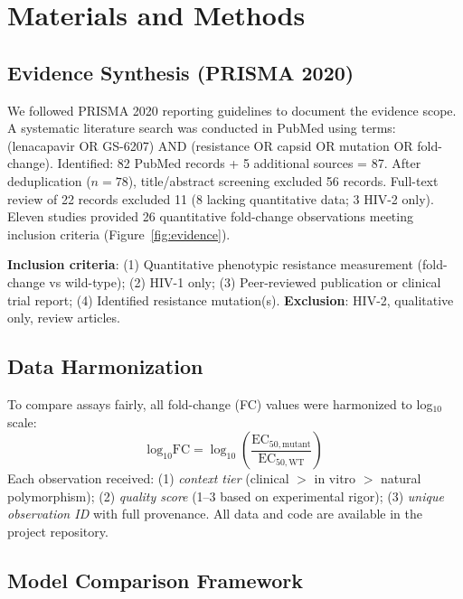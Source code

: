 \documentclass[12pt,a4paper]{article}
\begin{document}
\section{Materials and Methods}

\subsection{Evidence Synthesis (PRISMA 2020)}

We followed PRISMA 2020 reporting guidelines \cite{Page2021} to document the evidence scope. A systematic literature search was conducted in PubMed using terms: (lenacapavir OR GS-6207) AND (resistance OR capsid OR mutation OR fold-change). Identified: 82 PubMed records + 5 additional sources = 87. After deduplication ($n=78$), title/abstract screening excluded 56 records. Full-text review of 22 records excluded 11 (8 lacking quantitative data; 3 HIV-2 only). Eleven studies provided 26 quantitative fold-change observations meeting inclusion criteria (Figure~\ref{fig:evidence}).

\textbf{Inclusion criteria}: (1) Quantitative phenotypic resistance measurement (fold-change vs wild-type); (2) HIV-1 only; (3) Peer-reviewed publication or clinical trial report; (4) Identified resistance mutation(s). \textbf{Exclusion}: HIV-2, qualitative only, review articles.

\subsection{Data Harmonization}

To compare assays fairly, all fold-change (FC) values were harmonized to log$_{10}$ scale:
\begin{equation}
\text{log}_{10}\text{FC} = \log_{10}\left(\frac{\text{EC}_{50,\text{mutant}}}{\text{EC}_{50,\text{WT}}}\right)
\end{equation}
Each observation received: (1) \textit{context tier} (clinical $>$ in vitro $>$ natural polymorphism); (2) \textit{quality score} (1--3 based on experimental rigor); (3) \textit{unique observation ID} with full provenance. All data and code are available in the project repository.

\subsection{Model Comparison Framework}
\end{document}
